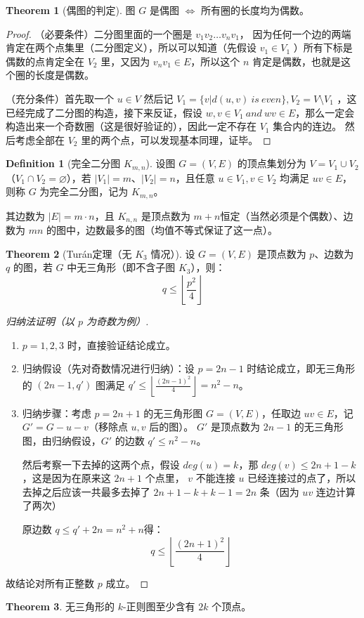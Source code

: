 \documentclass[oneside]{book}
\theoremstyle{definition}
\newtheorem{definition}{Definition}[section]
\newtheorem{theorem}{Theorem}[section]
\begin{document}
\begin{theorem}[偶图的判定]
	图 \(G\) 是偶图 \(\iff\) 所有圈的长度均为偶数。
\end{theorem}
\begin{proof}
	（必要条件）二分图里面的一个圈是 \(v_1v_2\dots v_n v_1\)， 因为任何一个边的两端肯定在两个点集里（二分图定义），所以可以知道（先假设 \(v_1\in V_1\) ）所有下标是偶数的点肯定全在 \(V_2\) 里，又因为 \(v_nv_1\in E\)，所以这个 \(n\) 肯定是偶数，也就是这个圈的长度是偶数。
	
	（充分条件）首先取一个 \(u\in V\) 然后记 \(V_1=\{v|d(u,v)\ is\ even\},V_2=V\setminus V_1\) ，这已经完成了二分图的构造，接下来反证，假设 \(w,v\in V_1\ and\ wv\in E\)，那么一定会构造出来一个奇数圈（这是很好验证的），因此一定不存在 \(V_1\) 集合内的连边。
	然后考虑全部在 \(V_2\) 里的两个点，可以发现基本同理，证毕。
\end{proof}

\begin{definition}[完全二分图 \( K_{m,n} \)]
	设图 \( G = (V, E) \) 的顶点集划分为 \( V = V_1 \cup V_2 \)（\( V_1 \cap V_2 = \varnothing \)），若 \( |V_1| = m \)、\( |V_2| = n \)，且任意 \( u \in V_1, v \in V_2 \) 均满足 \( uv \in E \)，则称 \( G \) 为完全二分图，记为 \( K_{m,n} \)。
	
	其边数为 \( |E| = m \cdot n \)，且 \( K_{n,n} \) 是顶点数为 \( m+n \)恒定（当然必须是个偶数）、边数为 \( mn \) 的图中，边数最多的图（均值不等式保证了这一点）。
\end{definition}

\begin{theorem}[Turán定理（无 \( K_3 \) 情况）]
	设 \( G = (V, E) \) 是顶点数为 \( p \)、边数为 \( q \) 的图，若 \( G \) 中无三角形（即不含子图 \( K_3 \)），则：
	\[
	q \leq \left\lfloor \frac{p^2}{4} \right\rfloor
	\]
\end{theorem}
\begin{proof}[归纳法证明（以 \( p \) 为奇数为例）]
	\begin{enumerate}
		\item \( p = 1, 2, 3 \) 时，直接验证结论成立。
		\item 归纳假设（先对奇数情况进行归纳）：设 \( p = 2n-1 \) 时结论成立，即无三角形的 \( (2n-1, q') \) 图满足 \( q' \leq \left\lfloor \frac{(2n-1)^2}{4} \right\rfloor = n^2 - n \)。
		\item 归纳步骤：考虑 \( p = 2n+1 \) 的无三角形图 \( G = (V, E) \)，任取边 \( uv \in E \)，记 \( G' = G - u-v \)（移除点 \( u,v \) 后的图）。
		\( G' \) 是顶点数为 \( 2n-1 \) 的无三角形图，由归纳假设，\( G' \) 的边数 \( q' \leq n^2 - n \)。
		
		然后考察一下去掉的这两个点，假设 \(deg(u)=k\)，那 \(deg(v)\leq 2n+1-k\)，这是因为在原来这 \(2n+1\) 个点里， \(v\) 不能连接 \(u\) 已经连接过的点了，所以去掉之后应该一共最多去掉了 \(2n+1-k+k-1=2n\) 条（因为 \(uv\) 连边计算了两次）
		
		原边数 \( q \leq q' + 2n=n^2+n \)得：
		\[
		q \leq \left\lfloor \frac{(2n+1)^2}{4} \right\rfloor
		\]
	\end{enumerate}
	故结论对所有正整数 \( p \) 成立。
\end{proof}
\begin{theorem}
	无三角形的 \( k \)-正则图至少含有 \( 2k \) 个顶点。
\end{theorem}
\end{document}
